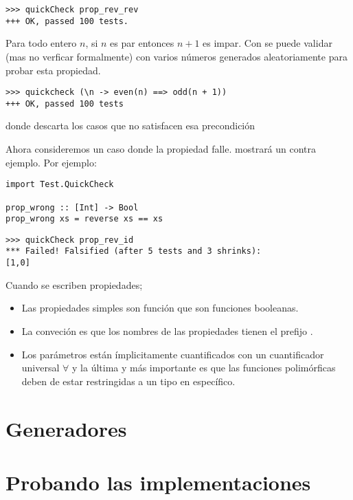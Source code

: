 \begin{verbatim}
>>> quickCheck prop_rev_rev
+++ OK, passed 100 tests.
\end{verbatim}

Para todo entero $n$, si $n$ es par entonces $n+1$ es impar. Con \QuickCheck se puede validar (mas
no verficar formalmente) con varios números generados aleatoriamente para probar esta propiedad.
\begin{verbatim}
>>> quickcheck (\n -> even(n) ==> odd(n + 1))
+++ OK, passed 100 tests
\end{verbatim}

donde \hsCode{==>} descarta los casos que no satisfacen esa precondición

Ahora consideremos un caso donde la propiedad falle. \QuickCheck mostrará un contra ejemplo. Por
ejemplo:
\begin{verbatim}
import Test.QuickCheck

prop_wrong :: [Int] -> Bool
prop_wrong xs = reverse xs == xs 
\end{verbatim}

\begin{verbatim}
>>> quickCheck prop_rev_id
*** Failed! Falsified (after 5 tests and 3 shrinks):
[1,0]
\end{verbatim}

Cuando se escriben propiedades;
\begin{itemize}
\item Las propiedades simples son función que son funciones booleanas.
\item La conveción es que los nombres de las propiedades tienen el prefijo .
\item Los parámetros están ímplicitamente cuantificados con un cuantificador universal $\forall$ y
la última y más importante es que las funciones polimórficas deben de estar restringidas a un tipo
en específico.
\end{itemize}

\section{Generadores}

\section{Probando las implementaciones}

